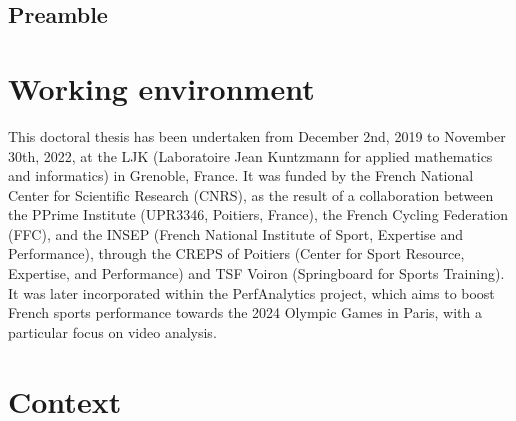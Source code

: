 {}

\vspace*{-1cm}
\begin{flushright}
\section*{\fontsize{20pt}{20pt}\selectfont\textnormal{Preamble}}
\end{flushright}
\vspace{2cm}

\chead[\fancyplain{}{}]
      {\fancyplain{}{}}
\lfoot[\fancyplain{}{}]%
      {\fancyplain{}{}}
\cfoot[\fancyplain{}{\thepage}]
      {\fancyplain{}{\thepage}}
\rfoot[\fancyplain{}{}]%
     {\fancyplain{}{\scriptsize}}
     


\section*{Working environment}

This doctoral thesis has been undertaken from December 2nd, 2019 to November 30th, 2022, at the LJK (Laboratoire Jean Kuntzmann for applied mathematics and informatics) in Grenoble, France. It was funded by the French National Center for Scientific Research (CNRS), as the result of a collaboration between the PPrime Institute (UPR3346, Poitiers, France), the French Cycling Federation (FFC), and the INSEP (French National Institute of Sport, Expertise and Performance), through the CREPS of Poitiers (Center for Sport Resource, Expertise, and Performance) and TSF Voiron (Springboard for Sports Training). It was later incorporated within the PerfAnalytics project, which aims to boost French sports performance towards the 2024 Olympic Games in Paris, with a particular focus on video analysis.


\section*{Context}

